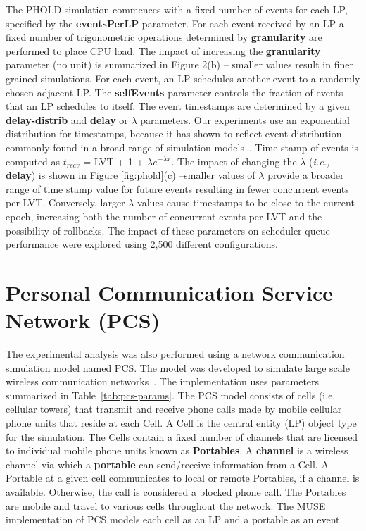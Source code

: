 The PHOLD simulation commences with a fixed number of events for each LP, specified by the \textbf{eventsPerLP} parameter. For each event received by an LP a fixed number of trigonometric operations determined by \textbf{granularity} are performed to place CPU load. The impact of increasing the \textbf{granularity} parameter (no unit) is summarized in Figure 2(b) -- smaller values result in finer grained simulations. For each event, an LP schedules another event to a randomly chosen adjacent LP.  The \textbf{selfEvents} parameter controls the fraction of events that an LP schedules to itself.
The event timestamps are determined by a given \textbf{delay\--distrib} and \textbf{delay} or $\lambda$ parameters. Our experiments use an exponential distribution for timestamps, because it has shown to reflect event distribution commonly found in a broad range of simulation models~\cite{tang-05}. Time stamp of events is computed as $t_{recv}$ = LVT + 1 + $\lambda e^{-\lambda x}$. The impact of changing the $\lambda$ (\textit{i.e.,} \textbf{delay}) is shown in Figure \ref{fig:phold}(c) --smaller values of $\lambda$ provide a broader range of time stamp value for future events resulting in fewer concurrent events per LVT. Conversely, larger $\lambda$ values cause timestamps to be close to the current epoch, increasing both the number of concurrent events per LVT and the possibility of rollbacks. The impact of these parameters on scheduler queue performance were explored using 2,500 different configurations.



\section{Personal Communication Service Network (PCS)}\label{sec:pcs}

The experimental analysis was also performed using a network communication simulation model named PCS. The model was developed to simulate large scale wireless communication networks~\cite{carothers-94}. The implementation uses parameters summarized in Table~\ref{tab:pcs-params}. The PCS model consists of cells (i.e. cellular towers) that transmit and receive phone calls made by mobile cellular phone units that reside at each Cell. A Cell is the central entity (LP) object type for the simulation. The Cells contain a fixed number of channels that are licensed to individual mobile phone units known as \textbf{Portables}. A \textbf{channel} is a wireless channel via which a \textbf{portable} can send/receive information from a Cell. A Portable at a given cell communicates to local or remote Portables, if a channel is available. Otherwise, the call is considered a blocked phone call. The Portables are mobile and travel to various cells throughout the network. The MUSE implementation of PCS models each cell as an LP and a portable as an event.

